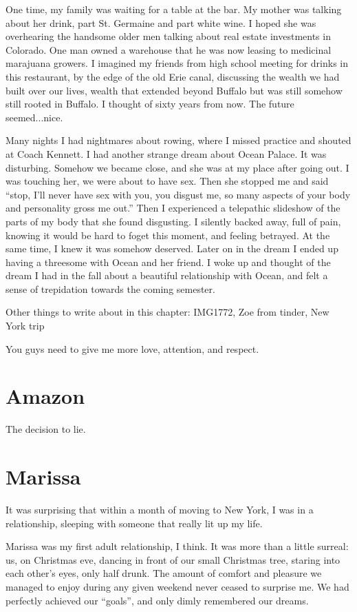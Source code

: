 \documentclass[12pt]{memoir}
\begin{document}
One time, my family was waiting for a table at the bar.  My mother was talking
about her drink, part St. Germaine and part white wine.  I hoped she was
overhearing the handsome older men talking about real estate investments in
Colorado.  One man owned a warehouse that he was now leasing to medicinal
marajuana growers.  I imagined my friends from high school meeting for drinks in
this restaurant, by the edge of the old Erie canal, discussing the wealth we had
built over our lives, wealth that extended beyond Buffalo but was still somehow
still rooted in Buffalo.  I thought of sixty years from now.  The future
seemed...nice.

Many nights I had nightmares about rowing, where I missed practice and shouted
at Coach Kennett.  I had another strange dream about Ocean Palace.  It was
disturbing.  Somehow we became close, and she was at my place after going out.
I was touching her, we were about to have sex.  Then she stopped me and said
``stop, I'll never have sex with you, you disgust me, so many aspects of your
body and personality gross me out.''  Then I experienced a telepathic slideshow
of the parts of my body that she found disgusting.  I silently backed away, full
of pain, knowing it would be hard to foget this moment, and feeling betrayed.
At the same time, I knew it was somehow deserved.  Later on in the dream I ended
up having a threesome with Ocean and her friend.  I woke up and thought of the
dream I had in the fall about a beautiful relationship with Ocean, and felt a
sense of trepidation towards the coming semester.

Other things to write about in this chapter: IMG1772, Zoe from tinder, New York
trip

You guys need to give me more love, attention, and respect.

\chapter{Amazon}
The decision to lie.

\chapter{Marissa}
It was surprising that within a month of moving to New York, I was in a
relationship, sleeping with someone that really lit up my life.

Marissa was my first adult relationship, I think.  It was more than a little
surreal: us, on Christmas eve, dancing in front of our small Christmas tree,
staring into each other's eyes, only half drunk.  The amount of comfort and
pleasure we managed to enjoy during any given weekend never ceased to surprise
me.  We had perfectly achieved our ``goals'', and only dimly remembered our
dreams.
\end{document}
